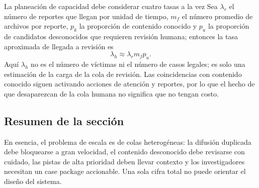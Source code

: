 \begin{importantbox}{La planeación de capacidad debe considerar cuatro tasas a la vez}
Sea $\lambda_r$ el número de reportes que llegan por unidad de tiempo, $m_f$ el número promedio de archivos por reporte, $p_k$ la proporción de contenido conocido y $p_u$ la proporción de candidatos desconocidos que requieren revisión humana; entonces la tasa aproximada de llegada a revisión es
\[
\lambda_h \approx \lambda_r m_f p_u.
\]
Aquí $\lambda_h$ no es el número de víctimas ni el número de casos legales; es solo una estimación de la carga de la cola de revisión. Las coincidencias con contenido conocido siguen activando acciones de atención y reportes, por lo que el hecho de que desaparezcan de la cola humana no significa que no tengan costo.
\end{importantbox}


\subsection{Resumen de la sección}

En esencia, el problema de escala es de colas heterogéneas: la difusión duplicada debe bloquearse a gran velocidad, el contenido desconocido debe revisarse con cuidado, las pistas de alta prioridad deben llevar contexto y los investigadores necesitan un case package accionable. Una sola cifra total no puede orientar el diseño del sistema.
